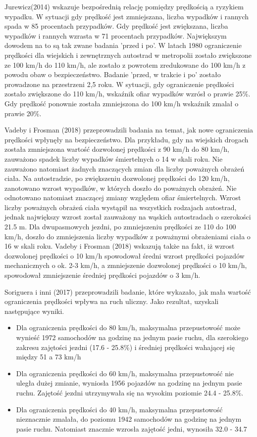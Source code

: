 Jurewicz(2014) wskazuje bezpośrednią relację pomiędzy prędkością a ryzykiem wypadku. W sytuacji gdy prędkość jest zmniejszana,  liczba wypadków i rannych spada w 85 procentach przypadków. Gdy prędkość jest zwiększana, liczba wypadków i rannych wzrasta w 71 procentach przypadków. Największym dowodem na to są tak zwane badania 'przed i po'. W latach 1980 ograniczenie prędkości dla wiejskich i zewnętrznych autostrad w metropolii zostało zwiększone ze 100 km/h do 110 km/h, ale zostało  z powrotem zredukowane do 100 km/h z powodu obaw o bezpieczeństwo. Badanie 'przed, w trakcie i po' zostało prowadzone na przestrzeni 2,5 roku. W sytuacji, gdy ograniczenie prędkości zostało zwiększone do 110 km/h, wskaźnik ofiar wypadków wzrósł o prawie 25\%. Gdy prędkość ponownie została zmniejszona do 100 km/h wskaźnik zmalał o prawie 20\%.

Vadeby i Frosman (2018) przeprowadzili badania na temat, jak nowe ograniczenia prędkości wpłynęły na bezpieczeństwo. Dla przykładu, gdy na wiejskich drogach została zmniejszona wartość dozwolonej prędkości z 90 km/h do 80 km/h, zauważono spadek liczby wypadków śmiertelnych o 14 w skali roku. Nie zauważono natomiast żadnych znaczących zmian dla liczby poważnych obrażeń ciała. Na autostradzie, po zwiększeniu dozwolonej prędkości do 120 km/h, zanotowano wzrost wypadków, w których doszło do poważnych obrażeń. Nie odnotowano natomiast znaczącej zmiany względem ofiar śmiertelnych. Wzrost liczby poważnych obrażeń ciała wystąpił na wszystkich rodzajach autostrad, jednak największy wzrost został zauważony na wąskich autostradach o szerokości 21.5 m. Dla dwupasmowych jezdni, po zmniejszeniu prędkości ze 110 do 100 km/h, doszło do zmniejszenia liczby wypadków z poważnymi obrażeniami ciała o 16 w skali roku. Vadeby i Frosman (2018) wskazują także na fakt, iż wzrost dozwolonej prędkości o 10 km/h spowodował średni wzrost prędkości pojazdów mechanicznych o ok. 2-3 km/h, a zmniejszenie dozwolonej prędkości o 10 km/h, spowodował zmniejszenie średniej prędkości pojazdów o 3 km/h. 

Soriguera i inni (2017) przeprowadzili badanie, które wykazało, jak mała wartość ograniczenia prędkości wpływa na ruch uliczny. Jako rezultat, uzyskali następujące wyniki.

\begin{itemize}
\item Dla ograniczenia prędkości do 80 km/h, maksymalna przepustowość może wynieść 1972 samochodów na godzinę na jednym pasie ruchu, dla szerokiego zakresu zajętości jezdni (17.6 - 25.8\%) i średniej prędkości wahającej się między 51 a 73 km/h     
\item Dla ograniczenia prędkości do 60 km/h, maksymalna przepustowość nie uległa dużej zmianie, wyniosła 1956 pojazdów na godzinę na jednym pasie ruchu. Zajętość jezdni utrzymywała się na wysokim poziomie 24.4 - 25.8\%. 
\item Dla ograniczenia prędkości do 40 km/h, maksymalna przepustowość nieznacznie zmalała, do poziomu 1942 samochodów na godzinę na jednym pasie ruchu. Natomiast znacznie wzrosła zajętość jedni, wynosiła 32.0 - 34.7%
\end{itemize}

